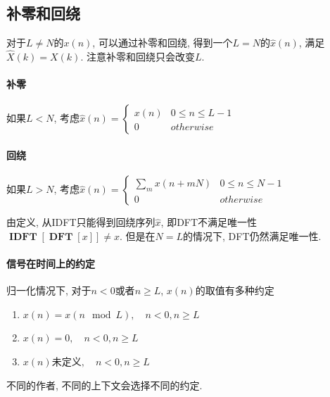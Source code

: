 \documentclass{ctexart}
\DeclareMathOperator{\DFT}{\mathbf{DFT}}
\DeclareMathOperator{\IDFT}{\mathbf{IDFT}}
\begin{document}
\subsection{补零和回绕} 对于$L \neq N$的$x(n)$, 可以通过补零和回绕, 得到一个$L = N$的$\hat{x}(n)$, 满足$\hat{X}(k) = X(k)$.
    注意补零和回绕只会改变$L$.
\paragraph{补零} 如果$L < N$, 考虑$\hat{x}(n) = \begin{cases} x(n) & 0 \le n \le L - 1\\ 0 & otherwise \end{cases}$
\paragraph{回绕} 如果$L > N$, 考虑$\hat{x}(n) = \begin{cases} \sum_m x(n + mN) & 0 \le n \le N - 1 \\ 0 & otherwise \end{cases}$\par
    由定义, 从IDFT只能得到回绕序列$\hat{x}$, 即DFT不满足唯一性 $\IDFT[\DFT [x]] \neq x$. 但是在$N = L$的情况下, DFT仍然满足唯一性.
\paragraph{信号在时间上的约定}
    归一化情况下, 对于$n < 0$或者$n \ge L$, $x(n)$的取值有多种约定 \begin{enumerate}
        \item $x(n) = x(n \mod L),\quad n < 0, n \ge L$
        \item $x(n) = 0,\quad n < 0, n \ge L$
        \item $x(n)$未定义$,\quad n < 0, n \ge L$
    \end{enumerate}
    不同的作者, 不同的上下文会选择不同的约定.
\end{document}
